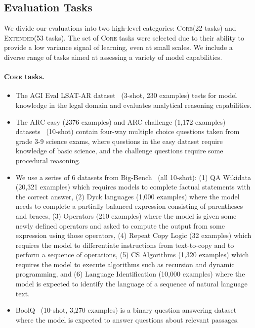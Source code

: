 \documentclass{article}
\newcommand{\lowvar}{\textsc{Core}\xspace}
\newcommand{\lowvartasks}{22\xspace}
\newcommand{\aggscore}{\textsc{Extended}\xspace}
\newcommand{\aggtasks}{53\xspace}
\begin{document}
\subsection{Evaluation Tasks}

We divide our evaluations into two high-level categories: \lowvar (\lowvartasks tasks) and \aggscore (\aggtasks tasks). The set of \lowvar tasks were selected due to their ability to provide a low variance signal of learning, even at small scales. We include a diverse range of tasks aimed at assessing a variety of model capabilities.

\paragraph{\lowvar tasks.}

\begin{itemize}
    \item
    The AGI Eval LSAT-AR dataset~\citep{zhong2023agieval} (3-shot, 230 examples) tests for model knowledge in the legal domain and evaluates analytical reasoning capabilities.
    \item
    The ARC easy (2376 examples) and ARC challenge (1,172 examples) datasets~\citep{arc} (10-shot) contain four-way multiple choice questions taken from grade 3-9 science exams, where questions in the easy dataset require knowledge of basic science, and the challenge questions require some procedural reasoning.
    \item
    We use a series of 6 datasets from Big-Bench~\citep{srivastava2023beyond} (all 10-shot): (1) QA Wikidata (20,321 examples) which requires models to complete factual statements with the correct answer, (2) Dyck languages (1,000 examples) where the model needs to complete a partially balanced expression consisting of parentheses and braces, (3) Operators (210 examples) where the model is given some newly defined operators and asked to compute the output from some expression using those operators, (4) Repeat Copy Logic (32 examples) which requires the model to differentiate instructions from text-to-copy and to perform a sequence of operations, (5) CS Algorithms (1,320 examples) which requires the model to execute algorithms such as recursion and dynamic programming, and (6) Language Identification (10,000 examples) where the model is expected to identify the language of a sequence of natural language text.
    \item
    BoolQ~\citep{boolq} (10-shot, 3,270 examples) is a binary question answering dataset where the model is expected to answer questions about relevant passages.

\end{itemize}
\end{document}

